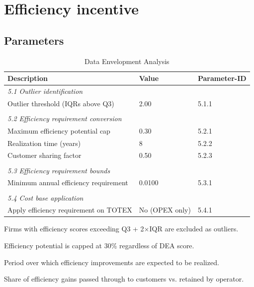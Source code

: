 \section{Efficiency incentive}

\subsection{Parameters}

\begin{table}[H]
\centering
\footnotesize
\begin{threeparttable}
\caption{Data Envelopment Analysis}
\label{tab:dea-parameters}
\begin{tabular}{@{}p{8cm}ll@{}}
\toprule
\textbf{Description} & \textbf{Value} & \textbf{Parameter-ID} \\
\midrule
\multicolumn{3}{l}{\textit{5.1 Outlier identification}} \\
Outlier threshold (IQRs above Q3)\tnote{a} & 2.00 & 5.1.1 \\
\\
\multicolumn{3}{l}{\textit{5.2 Efficiency requirement conversion}} \\
Maximum efficiency potential cap\tnote{b} & 0.30 & 5.2.1 \\
Realization time (years)\tnote{c} & 8 & 5.2.2 \\
Customer sharing factor\tnote{d} & 0.50 & 5.2.3 \\
\\
\multicolumn{3}{l}{\textit{5.3 Efficiency requirement bounds}} \\
Minimum annual efficiency requirement & 0.0100 & 5.3.1 \\
\\
\multicolumn{3}{l}{\textit{5.4 Cost base application}} \\
Apply efficiency requirement on TOTEX & No (OPEX only) & 5.4.1 \\
\bottomrule
\end{tabular}
\begin{tablenotes}
\item[a] Firms with efficiency scores exceeding Q3 + 2$\times$IQR are excluded as outliers.
\item[b] Efficiency potential is capped at 30\% regardless of DEA score.
\item[c] Period over which efficiency improvements are expected to be realized.
\item[d] Share of efficiency gains passed through to customers vs. retained by operator.
\end{tablenotes}
\end{threeparttable}
\end{table}

